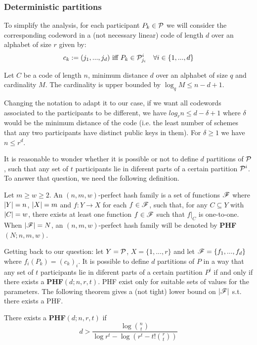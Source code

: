 \subsubsection*{Deterministic partitions}


To simplify the analysis, for each participant $P_k \in {\mathcal P}$ we will consider the corresponding codeword in a (not necessary linear) code of length $d$ over an alphabet of size $r$ given by:
$$c_k := (j_1, ... , j_d) \text{ iff } P_k \in {\mathcal P}^i_{j_i} \quad \forall i \in \{1, ..., d\}$$

\begin{thm}
Let $C$ be a code of length $n$, minimum distance $d$ over an alphabet of size $q$ and cardinality $M$. The cardinality is upper bounded by $\log_q M \leq n-d+1$.
\end{thm}

Changing the notation to adapt it to our case, if we want all codewords associated to the participants to be different, we have $log_r n \leq d - \delta + 1$ where $\delta$ would be the minimum distance of the code (i.e. the least number of schemes that any two participants have distinct public keys in them). For $\delta \geq 1$ we have $n \leq r^d$.

It is reasonable to wonder whether it is possible or not to define $d$ partitions of ${\mathcal P}$, such that any set of $t$ participants lie in diferent parts of a certain partition ${\mathcal P}^i$. To answer that question, we need the following definition.

 Let $m \geq w \geq 2$. An $(n,m,w)$-perfect hash family is a set of functions ${\mathscr F}$ where $\left\vert {Y} \right\vert = n$, $\left\vert {X} \right\vert = m$ and $f: Y \rightarrow X$ for each $f \in {\mathscr F}$, such that, for any $C \subseteq Y$ with $\left\vert {C} \right\vert = w$, there exists at least one function $f \in {\mathscr F}$ such that $f \vert_C$ is one-to-one. When $\left\vert {{\mathscr F}} \right\vert = N$, an $(n,m,w)$-perfect hash family will be denoted by \textbf{PHF}$(N;n,m,w)$.

Getting back to our question: let $Y = {\mathcal P}$, $X = \{1, ..., r\}$ and let ${\mathscr F} = \{f_1, ..., f_d\}$ where $f_i(P_k) = (c_k)_i$. It is possible to define $d$ partitions of $P$ in a way that any set of $t$ participants lie in diferent parts of a certain partition $P^i$ if and only if there exists a \textbf{PHF}$(d;n,r,t)$. PHF exist only for suitable sets of values for the parameters. The following theorem gives a (not tight) lower bound on $\left\vert {{\mathscr F}} \right\vert$ s.t. there exists a PHF.

\begin{thm}
There exists a \textbf{PHF}$(d;n,r,t)$ if
$$ d > \frac{\log \binom{n}{t}}{\log r^t - \log (r^t - t! \binom{r}{t})} $$
\end{thm}

